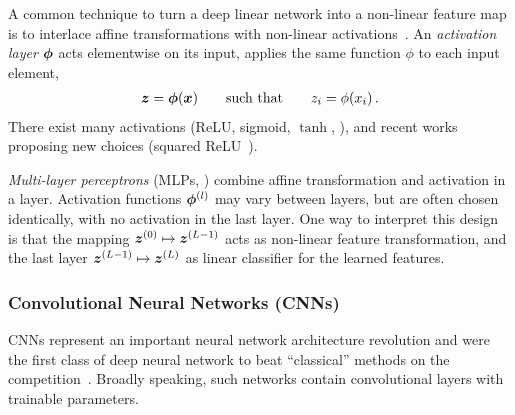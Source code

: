 A common technique to turn a deep linear network into a non-linear feature map
is to interlace affine transformations with non-linear
activations~\cite{rosenblatt1958perceptron}. An \emph{activation layer} ${\bm{\phi}}$
acts elementwise on its input, \ie applies the same function $\phi$ to each
input element,
\begin{align*}
  {\bm{z}} = {\bm{\phi}}({\bm{x}})\qquad \text{such that}\qquad {z}_i = \phi({x}_i)\,.
\end{align*}
There exist many activations (ReLU, sigmoid, $\tanh$, \etc \cite[Chapter
6]{goodfellow2016deep}), and recent works proposing new choices (\eg squared
ReLU~\citep{so2021searching}).

\emph{Multi-layer perceptrons} %
%
(MLPs, ) combine affine transformation and activation
in a layer. Activation functions ${\bm{\phi}}^{(l)}$ may vary between layers, but are
often chosen identically, with no activation in the last layer. One way to
interpret this design is that the mapping ${\bm{z}}^{(0)} \mapsto {\bm{z}}^{(L-1)}$ acts
as non-linear feature transformation, and the last layer ${\bm{z}}^{(L-1)} \mapsto
{\bm{z}}^{(L)}$ as linear classifier for the learned features.

\subsubsection{Convolutional Neural Networks (CNNs)}

CNNs represent an important neural network architecture revolution and were the
first class of deep neural network to beat ``classical'' methods on the
\imagenet
competition~\cite{deng2009imagenet,krizhevsky2012imagenet,russakovsky2015imagenet}.
Broadly speaking, such networks contain convolutional layers with trainable
parameters.

